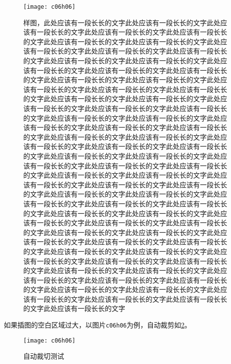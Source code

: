 {\begin{figure}[!htbp]
    \centering
    \texttt{[image: c06h06]}
    \caption{样图，此处应该有一段长长的文字此处应该有一段长长的文字此处应该有一段长长的文字此处应该有一段长长的文字此处应该有一段长长的文字此处应该有一段长长的文字此处应该有一段长长的文字此处应该有一段长长的文字此处应该有一段长长的文字此处应该有一段长长的文字此处应该有一段长长的文字此处应该有一段长长的文字此处应该有一段长长的文字此处应该有一段长长的文字此处应该有一段长长的文字此处应该有一段长长的文字此处应该有一段长长的文字此处应该有一段长长的文字此处应该有一段长长的文字此处应该有一段长长的文字此处应该有一段长长的文字此处应该有一段长长的文字此处应该有一段长长的文字此处应该有一段长长的文字此处应该有一段长长的文字此处应该有一段长长的文字此处应该有一段长长的文字此处应该有一段长长的文字此处应该有一段长长的文字此处应该有一段长长的文字此处应该有一段长长的文字此处应该有一段长长的文字此处应该有一段长长的文字此处应该有一段长长的文字此处应该有一段长长的文字此处应该有一段长长的文字此处应该有一段长长的文字此处应该有一段长长的文字此处应该有一段长长的文字此处应该有一段长长的文字此处应该有一段长长的文字此处应该有一段长长的文字此处应该有一段长长的文字此处应该有一段长长的文字此处应该有一段长长的文字此处应该有一段长长的文字此处应该有一段长长的文字此处应该有一段长长的文字此处应该有一段长长的文字此处应该有一段长长的文字此处应该有一段长长的文字此处应该有一段长长的文字此处应该有一段长长的文字此处应该有一段长长的文字此处应该有一段长长的文字此处应该有一段长长的文字此处应该有一段长长的文字此处应该有一段长长的文字此处应该有一段长长的文字此处应该有一段长长的文字此处应该有一段长长的文字此处应该有一段长长的文字此处应该有一段长长的文字此处应该有一段长长的文字此处应该有一段长长的文字此处应该有一段长长的文字此处应该有一段长长的文字此处应该有一段长长的文字此处应该有一段长长的文字此处应该有一段长长的文字此处应该有一段长长的文字此处应该有一段长长的文字此处应该有一段长长的文字此处应该有一段长长的文字此处应该有一段长长的文字此处应该有一段长长的文字}%
    \label{fig:c06}
\end{figure}

如果插图的空白区域过大，以图片\verb|c06h06|为例，自动裁剪如\ref{fig:c06h06_trim}。
\begin{figure}[!htbp]
    \centering
    \texttt{[image: c06h06]}
    \caption{自动裁切测试}%
    \label{fig:c06h06_trim}
\end{figure}

}
